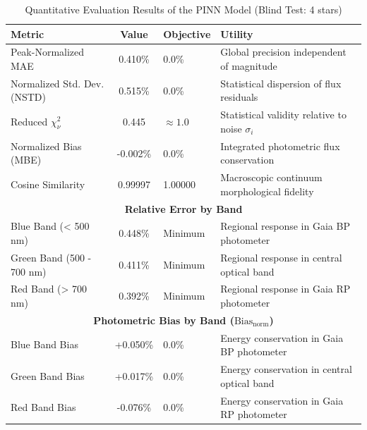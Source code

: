 
\begin{table}[htpb]
\centering
\caption{Quantitative Evaluation Results of the PINN Model (Blind Test: 4 stars)}
\label{tab:pinn_evaluation}
\begin{tabular}{lcll}
\hline
\textbf{Metric} & \textbf{Value} & \textbf{Objective} & \textbf{Utility} \\
\hline
Peak-Normalized MAE & 0.410\% & 0.0\% & Global precision independent of magnitude \\
Normalized Std. Dev. (NSTD) & 0.515\% & 0.0\% & Statistical dispersion of flux residuals \\
Reduced $\chi^2_\nu$ & 0.445 & $\approx 1.0$ & Statistical validity relative to noise $\sigma_i$ \\
Normalized Bias (MBE) & -0.002\% & 0.0\% & Integrated photometric flux conservation \\
Cosine Similarity & 0.99997 & 1.00000 & Macroscopic continuum morphological fidelity \\
\hline
\multicolumn{4}{c}{\textbf{Relative Error by Band}} \\
\hline
Blue Band (< 500 nm) & 0.448\% & Minimum & Regional response in Gaia BP photometer \\
Green Band (500 - 700 nm) & 0.411\% & Minimum & Regional response in central optical band \\
Red Band (> 700 nm) & 0.392\% & Minimum & Regional response in Gaia RP photometer \\
\hline
\multicolumn{4}{c}{\textbf{Photometric Bias by Band ($\text{Bias}_{\text{norm}}$)}} \\
\hline
Blue Band Bias & +0.050\% & 0.0\% & Energy conservation in Gaia BP photometer \\
Green Band Bias & +0.017\% & 0.0\% & Energy conservation in central optical band \\
Red Band Bias & -0.076\% & 0.0\% & Energy conservation in Gaia RP photometer \\
\hline
\end{tabular}
\end{table}
